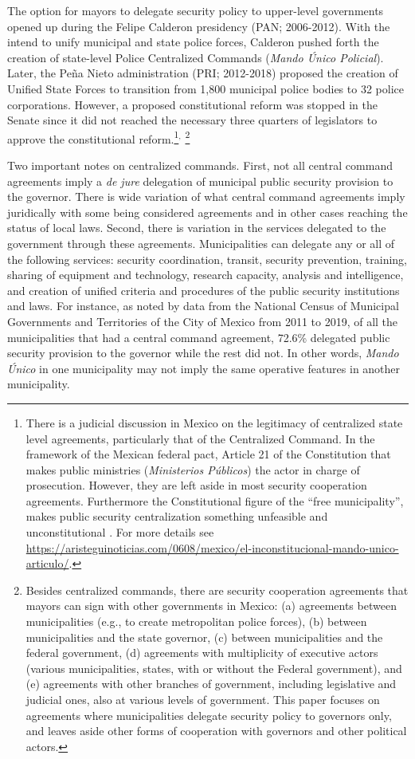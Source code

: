 \documentclass[12pt]{amsart}
\numberwithin{equation}{section}
\theoremstyle{definition}
\theoremstyle{definition}
\theoremstyle{definition}
\begin{document}
The option for mayors to delegate security policy to upper-level governments opened up during the Felipe Calderon presidency (PAN; 2006-2012). With the intend to unify municipal and state police forces, Calderon pushed forth the creation of state-level Police Centralized   Commands (\emph{Mando \'Unico Policial}). Later, the Peña Nieto administration (PRI; 2012-2018) proposed the creation of Unified State Forces to transition from 1,800 municipal police bodies to 32 police corporations. However, a proposed constitutional reform was stopped in the Senate since it did not reached the necessary three quarters of legislators to approve the constitutional reform.\footnote{There is a judicial discussion in Mexico on the legitimacy of centralized state level agreements, particularly that of the Centralized Command. In the framework of the Mexican federal pact, Article 21 of the Constitution that makes public ministries (\emph{Ministerios P\'ublicos}) the actor in charge of prosecution. However, they are  left aside in most security cooperation agreements. Furthermore the Constitutional figure of the ``free municipality'', makes public security centralization something unfeasible and unconstitutional \citep{moloeznik_2016}. For more details see \url{https://aristeguinoticias.com/0608/mexico/el-inconstitucional-mando-unico-articulo/}.}$^,$ \footnote{Besides centralized commands, there are security cooperation agreements that mayors can sign with other governments in Mexico: (a) agreements between municipalities (e.g., to create metropolitan police forces), (b) between municipalities and the state governor, (c) between municipalities and the federal government, (d) agreements with multiplicity of executive actors (various municipalities, states, with or without the Federal government), and (e) agreements with other branches of government, including legislative and judicial ones, also at various levels of government. This paper focuses on agreements where municipalities delegate security policy to governors only, and leaves aside other forms of cooperation with governors and other political actors.} 

Two important notes on centralized commands. First, not all central command agreements imply a \emph{de jure} delegation of municipal public security provision to the governor. There is wide variation of what central command agreements imply juridically with some being considered agreements and in other cases reaching the status of local laws. Second, there is variation in the services delegated to the government through these agreements. Municipalities can delegate any or all of the following services: security coordination, transit, security prevention, training, sharing of equipment and technology, research capacity, analysis and intelligence, and creation of unified criteria and procedures of the public security institutions and laws. For instance, as noted by data from the National Census of Municipal Governments and Territories of the City of Mexico from 2011 to 2019, of all the municipalities that had a central command agreement, 72.6\% delegated public security provision to the governor while the rest did not. In other words, \emph{Mando \'Unico} in one municipality may not imply the same operative features in another municipality. 
\end{document}

